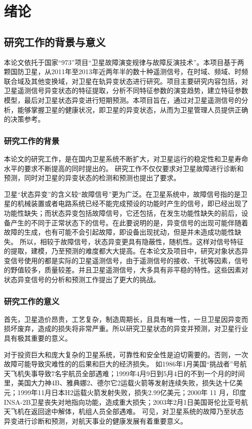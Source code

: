 
\chapter{绪论}{\label{chap:xulun}}

\section{研究工作的背景与意义}
本论文依托于国家“973”项目“卫星故障演变规律与故障反演技术”。本项目基于两颗国防卫星，从2011年至2013年近两年半的数十种遥测信号，在时域、频域、时频联合域及其他变换域，对卫星在轨异变状态进行研究。项目主要研究内容包括，对卫星遥测信号异变状态的特征提取，分析不同特征参数的演变趋势，建立特征参数模型，最后对卫星状态异变进行短期预测。本项目旨在，通过对卫星遥测信号的分析，能够掌握卫星的健康状况，即卫星的异变状态，从而为卫星管理人员提供正确的决策参考。

\subsection{研究工作的背景}
本论文的研究工作，是在国内卫星系统不断扩大，对卫星运行的稳定性和卫星寿命水平的要求不断提高的同时提出的。
研究工作不仅仅要求对卫星故障进行诊断和预测，同时对卫星的异变状态的检测和预测也提出了要求。

卫星“状态异变”的含义较“故障信号”更为广泛。在卫星系统中，故障信号指的是卫星的机械装置或者电路系统已经不能完成预设的功能时产生的信号，即已经出现了功能性缺失；而状态异变包括故障信号，它还包括，在发生功能性缺失的前后，设备产生的不同于正常状态下的信号。在此要说明的是，异变信号的出现可能伴随着故障的生成，也有可能不会引起故障，即设备出现扰动，但是并未造成功能性缺失。
所以，相较于故障信号，状态异变更具有隐蔽性，随机性。这样对信号特征的提取，建模，乃至预测的难度都大大提高。在本论文及项目中，研究对象状态异变信号使用的都是实际的卫星遥测信号，由于遥测信号的接收、干扰等因素，信号的野值较多，质量较差。并且卫星遥测信号，大多具有非平稳的特性。这些因素对状态异变信号的分析和预测工作提出了更大的挑战。

\subsection{研究工作的意义}

首先，卫星造价昂贵，工艺复杂，制造周期长，且具有唯一性，一旦卫星因异变而损坏废弃，造成的损失将非常严重。所以研究卫星状态的异变并预测，对卫星行业具有极其重要的意义。

对于投资巨大和庞大复杂的卫星系统，可靠性和安全性是迫切需要的。否则，一次故障可能导致灾难性的的后果和巨大的经济损失。
如1986年1月美国“挑战者”号航天飞机失事导致7名宇航员全部遇难；1999年4月9日到5月4日的不到一个月的时间里，美国大力神4B、雅典娜2、德尔它2运载火箭等发射连续失败，损失达十亿美元；1999年11月日本H2运载火箭发射失败，损失2.99亿美元；2000年 11 月，印度INSA-2B卫星丧失对地指向功能，造成重大损失；2003年2月1日美国哥伦比亚号航天飞机在返回途中解体，机组人员全部遇难。
可见，对卫星系统的故障乃至状态异变进行诊断和预测，对航天事业的健康发展有着重要意义。

